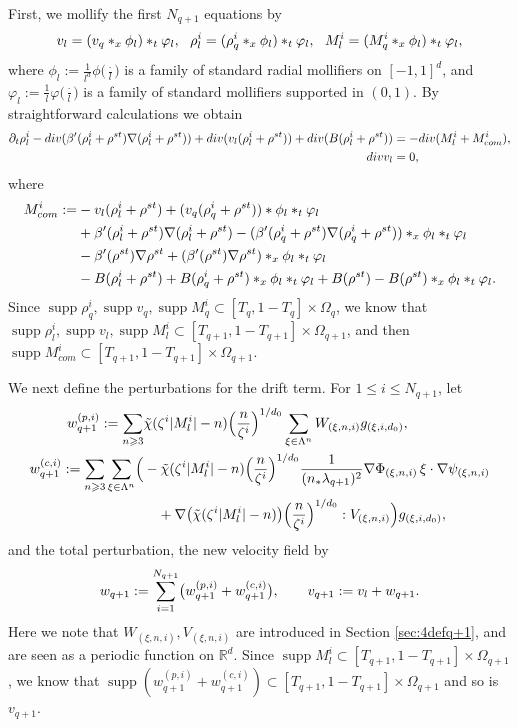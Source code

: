 \documentclass[10pt,a4paper]{amsart}
\numberwithin{equation}{section}
\DeclareMathOperator{\supp}{supp}
\def\geq{\geqslant}
\def\leq{\leqslant}
\def\div{\mathord{{\rm div}}}
\def\geq{\geqslant}
\def\leq{\leqslant}
\def\div{\mathord{{\rm div}}}
\begin{document}
First,  we mollify the first $N_{q+1}$ equations by\begin{align}
v_l=(v_{q }*_x\phi_l)*_t\varphi_l,\ \ 
 \rho_l^i=(\rho_{q}^i*_x\phi_l)*_t\varphi_l,\ \ M_l^i=(M_{q }^i*_x\phi_l)*_t\varphi_l,\notag
\end{align}
where 
$
\phi_l:=\frac1{l^d}\phi\bigl(\tfrac{\cdot}{l}\bigr)
$
is a family of standard radial mollifiers on $[-1,1]^d$, and  
$
\varphi_l:=\frac1l\varphi\bigl(\tfrac{\cdot}{l}\bigr)
$
is a family of standard mollifiers supported in $(0,1)$. By straightforward calculations  we obtain 
\begin{align}
\partial_t \rho_l^i-\div(\beta'(\rho_l^i+\rho^{st})\nabla(\rho_l^i+\rho^{st}))+\div(v_l (\rho_l^i+\rho^{st}))+\div(B(\rho_l^i+\rho^{st}))&=-\div (M^i_l+M^i_{com}),\notag\\ \div v_l&=0,\notag
\end{align} where
\begin{align*}
M^i_{com} :=&-v_l   (\rho^i_l+\rho^{st})+(v_{q}   (\rho^i_{q}+\rho^{st}))* \phi_l*_t\varphi_l\\
&+\beta'(\rho^i _l+\rho^{st}) \nabla(\rho^i _l+\rho^{st})-(\beta'(\rho^i _q+\rho^{st}) \nabla(\rho^i _q+\rho^{st}))*_x\phi_l*_t\varphi_l\\
&-\beta'(\rho^{st}) \nabla\rho^{st}+(\beta'(\rho^{st}) \nabla\rho^{st})*_x\phi_l*_t\varphi_l\\
 &  -B(\rho_l^i+\rho^{st})+B(\rho_q^i+\rho^{st})*_x\phi_l*_t\varphi_l +B(\rho^{st})-B(\rho^{st})*_x\phi_l*_t\varphi_l.\notag
\end{align*} 
  Since $  \supp\rho_q^i,\supp v_q,\supp M_q^i\subset[T_q,1-T_q]\times \Omega_q $, we know that $  \supp\rho_l^i,\supp v_l,\supp M_l^i\subset [T_{q+1},1-T_{q+1}]\times \Omega_{q+1} $, and then $\supp M_{com}^i\subset [T_{q+1},1-T_{q+1}]\times\Omega_{q+1} $.
 


We next define the perturbations for the drift term. 
For $1\leq i\leq N_{q+1}$, let
\begin{align*}
w_{q+1}^{(p,i)}
:=
\sum_{n\geq3}
&\tilde{\chi}(\zeta^i|M_l^i|-n)
\Bigl(\frac{n}{\zeta^i}\Bigr)^{1/d_0}
\sum_{\xi\in\Lambda^n}
W_{(\xi,n,i)}g_{(\xi,i,d_0)},\\
w_{q+1}^{(c,i)}
:=
\sum_{n\geq3}
\sum_{\xi\in\Lambda^n}
\Bigl(
&
-\tilde{\chi}(\zeta^i|M_l^i|-n)
\Bigl(\frac{n}{\zeta^i}\Bigr)^{1/d_0}
\frac1{(n_*\lambda_{q+1})^2}
\nabla\Phi_{(\xi,n,i)}
\,\xi\cdot\nabla\psi_{(\xi,n,i)}
\\
&\quad
+
\nabla\bigl(
\tilde{\chi}(\zeta^i|M_l^i|-n)
\bigr)
\Bigl(\frac{n}{\zeta^i}\Bigr)^{1/d_0}
:V_{(\xi,n,i)}
\Bigr)
g_{(\xi,i,d_0)},
\end{align*}
and the total perturbation, the new velocity field by
\begin{align}
w_{q+1}
:=
\sum_{i=1}^{N_{q+1}}
\bigl(
w_{q+1}^{(p,i)}
+
w_{q+1}^{(c,i)}
\bigr),
\qquad
v_{q+1}
:=
v_l+w_{q+1}.
\notag
\end{align}
Here we note that $W_{ (\xi,n,i)},V_{ (\xi,n,i)}$ are introduced in Section \ref{sec:4defq+1}, and are seen as a periodic function on $\mathbb{R}^d$.
Since $\supp M_l^i\subset[T_{q+1},1-T_{q+1}]\times\Omega_{q+1}$, we know that $\supp (w_{q+1}^{(p,i)}+w_{q+1}^{(c,i)})\subset[T_{q+1},1-T_{q+1}]\times\Omega_{q+1}$ and so is $v_{q+1}$.  
 
\end{document}
